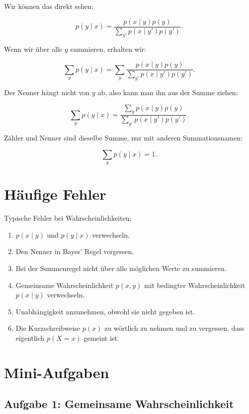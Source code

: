 Wir können das direkt sehen:

\[
    p(y \mid x)
    =
    \frac{
        p(x \mid y)p(y)
    }{
        \sum_{y'} p(x \mid y')p(y')
    }.
\]

Wenn wir über alle \(y\) summieren, erhalten wir:

\[
    \sum_y p(y \mid x)
    =
    \sum_y
    \frac{
        p(x \mid y)p(y)
    }{
        \sum_{y'} p(x \mid y')p(y')
    }.
\]

Der Nenner hängt nicht von \(y\) ab, also kann man ihn aus der Summe ziehen:

\[
    \sum_y p(y \mid x)
    =
    \frac{
        \sum_y p(x \mid y)p(y)
    }{
        \sum_{y'} p(x \mid y')p(y')
    }.
\]

Zähler und Nenner sind dieselbe Summe, nur mit anderen Summationsnamen:

\[
    \sum_y p(y \mid x)
    =
    1.
\]

\section{Häufige Fehler}

\begin{examtipbox}
Typische Fehler bei Wahrscheinlichkeiten:

\begin{enumerate}
    \item \(p(x \mid y)\) und \(p(y \mid x)\) verwechseln.
    \item Den Nenner in Bayes' Regel vergessen.
    \item Bei der Summenregel nicht über alle möglichen Werte zu summieren.
    \item Gemeinsame Wahrscheinlichkeit \(p(x,y)\) mit bedingter Wahrscheinlichkeit \(p(x \mid y)\) verwechseln.
    \item Unabhängigkeit anzunehmen, obwohl sie nicht gegeben ist.
    \item Die Kurzschreibweise \(p(x)\) zu wörtlich zu nehmen und zu vergessen, dass eigentlich \(p(X=x)\) gemeint ist.
\end{enumerate}
\end{examtipbox}

\section{Mini-Aufgaben}

\subsection{Aufgabe 1: Gemeinsame Wahrscheinlichkeit}

